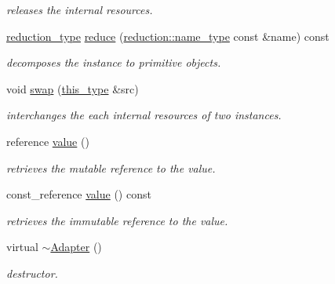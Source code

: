 \begin{DoxyCompactItemize}
\begin{DoxyCompactList}\small\item\em releases the internal resources. \end{DoxyCompactList}\item 
\hypertarget{classhryky_1_1_adapter_a42532b43ac680d162bbc1a2e3ebc6b99}{\hyperlink{namespacehryky_a343a9a4c36a586be5c2693156200eadc}{reduction\-\_\-type} \hyperlink{classhryky_1_1_adapter_a42532b43ac680d162bbc1a2e3ebc6b99}{reduce} (\hyperlink{namespacehryky_1_1reduction_ac686c30a4c8d196bbd0f05629a6b921f}{reduction\-::name\-\_\-type} const \&name) const }\label{classhryky_1_1_adapter_a42532b43ac680d162bbc1a2e3ebc6b99}

\begin{DoxyCompactList}\small\item\em decomposes the instance to primitive objects. \end{DoxyCompactList}\item 
\hypertarget{classhryky_1_1_adapter_ae95517793bc16f6ba623bc994bc17c43}{void \hyperlink{classhryky_1_1_adapter_ae95517793bc16f6ba623bc994bc17c43}{swap} (\hyperlink{classhryky_1_1_adapter_a30de4db4c91a113187fa2f0edbcb1b2a}{this\-\_\-type} \&src)}\label{classhryky_1_1_adapter_ae95517793bc16f6ba623bc994bc17c43}

\begin{DoxyCompactList}\small\item\em interchanges the each internal resources of two instances. \end{DoxyCompactList}\item 
\hypertarget{classhryky_1_1_adapter_ab736ecd30f215ca3cbd2364f818cb83f}{reference \hyperlink{classhryky_1_1_adapter_ab736ecd30f215ca3cbd2364f818cb83f}{value} ()}\label{classhryky_1_1_adapter_ab736ecd30f215ca3cbd2364f818cb83f}

\begin{DoxyCompactList}\small\item\em retrieves the mutable reference to the value. \end{DoxyCompactList}\item 
\hypertarget{classhryky_1_1_adapter_a5856f2ee6c0622e153f52fbb6ca6bbe9}{const\-\_\-reference \hyperlink{classhryky_1_1_adapter_a5856f2ee6c0622e153f52fbb6ca6bbe9}{value} () const }\label{classhryky_1_1_adapter_a5856f2ee6c0622e153f52fbb6ca6bbe9}

\begin{DoxyCompactList}\small\item\em retrieves the immutable reference to the value. \end{DoxyCompactList}\item 
\hypertarget{classhryky_1_1_adapter_ade755ad9d00ac8263162ef6918db68c9}{virtual \hyperlink{classhryky_1_1_adapter_ade755ad9d00ac8263162ef6918db68c9}{$\sim$\-Adapter} ()}\label{classhryky_1_1_adapter_ade755ad9d00ac8263162ef6918db68c9}

\begin{DoxyCompactList}\small\item\em destructor. \end{DoxyCompactList}\end{DoxyCompactItemize}
